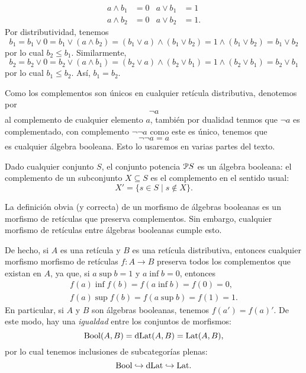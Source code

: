   \begin{align*}
    a\wedge b_1&=0 & a\vee b_1&=1 \\
    a\wedge b_2&=0 & a\vee b_2&=1.
  \end{align*}
  Por distributividad, tenemos
  \[
    b_1
    =b_1\vee 0
    =b_1\vee (a\wedge b_2)
    =(b_1\vee a)\wedge (b_1\vee b_2)
    =1\wedge (b_1\vee b_2)
    =b_1\vee b_2
  \]
  por lo cual $b_2\leq b_1$.
  Similarmente,
  \[
    b_2
    =b_2\vee 0
    =b_2\vee (a \wedge b_1)
    =(b_2\vee a)\wedge (b_2\vee b_1)
    =1\wedge (b_2\vee b_1)
    =b_2\vee b_1
  \]
  por lo cual $b_1\leq b_2$.
  Así, $b_1=b_2$.

Como los complementos son únicos en cualquier retícula distributiva, denotemos por \[\neg a\] 
al complemento de cualquier elemento $a$, también por dualidad tenmos que $\neg a$ es complementado,
con complemento $\neg\neg a$ como este es único, tenemos que \[\neg\neg a=a\] es cualquier álgebra booleana.
Esto lo usaremos en varias partes del texto.
\begin{example}
    Dado cualquier conjunto $S$, el conjunto potencia $\cal PS$ es un
    álgebra booleana: el complemento de un subconjunto $X\subseteq S$
    es el complemento en el sentido usual:
    \[
      X' = \{s\in S \mid s\not\in X\}
    .\]
\end{example}

\begin{remark}\label{obs:bool-plena-en-dlat}
La definición obvia (y correcta) de un morfismo de álgebras booleanas
es un morfismo de retículas que preserva complementos. Sin embargo,
cualquier morfismo de retículas entre álgebras booleanas cumple esto.

De hecho, si $A$ es una retícula y $B$ es una retícula distributiva,
entonces cualquier morfismo morfismo de retículas $f:A\to B$ preserva
todos los complementos que existan en $A$, ya que, si $a\sup b=1$
y $a\inf b=0$, entonces
\begin{align*}
  f(a)\inf f(b)=f(a\inf b)=f(0)=0, \\
  f(a)\sup f(b)=f(a\sup b)=f(1)=1.
\end{align*} 
En particular, si $A$ y $B$ son álgebras booleanas, tenemos
$f(a')=f(a)'$.
De este modo, hay una \emph{igualdad} entre los conjuntos de
morfismos:
\[
  \Bool(A,B) = \DLat(A,B) = \Lat(A,B)
,\]
por lo cual tenemos inclusiones de subcategorías plenas:
\begin{equation}
  \Bool \rmono \DLat \rmono \Lat.
\end{equation}
\end{remark}

